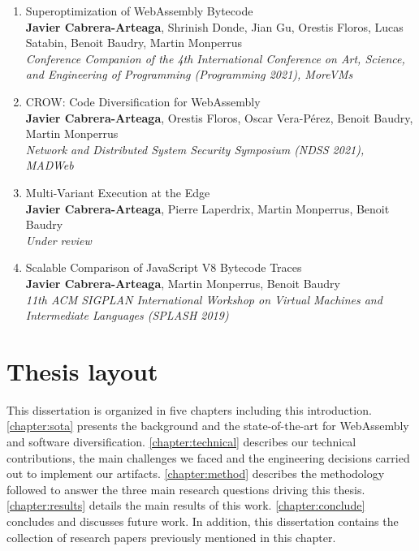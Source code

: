 \begin{enumerate}[label=\subscript{P}{{\arabic*}}]
    \item Superoptimization of WebAssembly Bytecode \cite{WasmSuperoptimizer}\\
    {\small\textbf{Javier Cabrera-Arteaga}, Shrinish Donde, Jian Gu, Orestis Floros, Lucas Satabin, Benoit Baudry, Martin Monperrus}\\
        \emph{Conference Companion of the 4th International Conference on Art, Science, and Engineering of Programming (Programming 2021), MoreVMs}

        \item CROW: Code Diversification for WebAssembly \cite{CROW}\\
    {\small\textbf{Javier Cabrera-Arteaga}, Orestis Floros, Oscar Vera-Pérez, Benoit Baudry, Martin Monperrus}\\
    \emph{Network and Distributed System Security Symposium (NDSS 2021), MADWeb}

    \item Multi-Variant Execution at the Edge \cite{MEWE}\\
    {\small\textbf{Javier Cabrera-Arteaga}, Pierre Laperdrix, Martin Monperrus, Benoit Baudry}\\
    \emph{Under review}

    \item Scalable Comparison of JavaScript V8 Bytecode Traces \cite{STRAC}\\
    {\small\textbf{Javier Cabrera-Arteaga}, Martin Monperrus, Benoit Baudry}\\
    \emph{11th ACM SIGPLAN International Workshop on Virtual Machines and Intermediate Languages (SPLASH 2019)}
\end{enumerate}

\section*{Thesis layout}

This dissertation is organized in five chapters including this introduction. \autoref{chapter:sota} presents the background and the state-of-the-art for WebAssembly and software diversification.
\autoref{chapter:technical} describes our technical contributions, the main challenges we faced and the engineering decisions carried out to implement our artifacts. \autoref{chapter:method} describes the methodology followed to answer the three main
research questions driving this thesis. \autoref{chapter:results} details the main results of this work. \autoref{chapter:conclude} concludes and discusses future work. 
In addition, this dissertation contains the collection of research papers previously mentioned in this chapter.